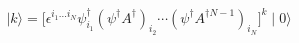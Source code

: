 \begin{equation}
\mid k \rangle = \bigl[ \epsilon ^{i_1 ... i_N} \psi^{\dag}_{i_1} 
(\psi^{\dag}
A^{\dag})_{i_2}\cdots(\psi^{\dag} A^{\dag N-1})_{i_N} \bigr] ^k \mid 0 \rangle
\label{state}
\end{equation}

